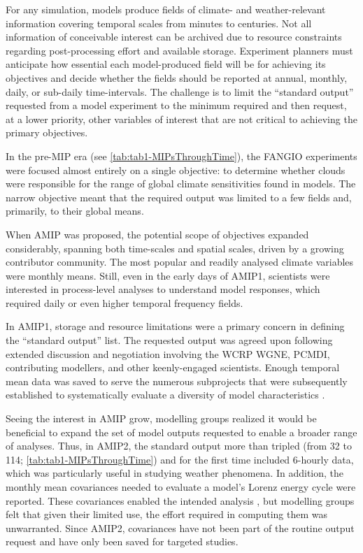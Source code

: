 \documentclass[manuscript]{copernicus}
\begin{document}
For any simulation, models produce fields of climate- and weather-relevant information covering temporal scales from minutes to centuries. Not all information of conceivable interest can be archived due to resource constraints regarding post-processing effort and available storage. Experiment planners must anticipate how essential each model-produced field will be for achieving its objectives and decide whether the fields should be reported at annual, monthly, daily, or sub-daily time-intervals. The challenge is to limit the ``standard output'' requested from a model experiment to the minimum required and then request, at a lower priority, other variables of interest that are not critical to achieving the primary objectives.

In the pre-MIP era (see \autoref{tab:tab1-MIPsThroughTime}), the FANGIO experiments were focused almost entirely on a single objective: to determine whether clouds were responsible for the range of global climate sensitivities found in models. The narrow objective meant that the required output was limited to a few fields and, primarily, to their global means.

When AMIP was proposed, the potential scope of objectives expanded considerably, spanning both time-scales and spatial scales, driven by a growing contributor community. The most popular and readily analysed climate variables were monthly means. Still, even in the early days of AMIP1, scientists were interested in process-level analyses to understand model responses, which required daily or even higher temporal frequency fields.

In AMIP1, storage and resource limitations were a primary concern in defining the ``standard output'' list. The requested output was agreed upon following extended discussion and negotiation involving the WCRP WGNE, PCMDI, contributing modellers, and other keenly-engaged scientists. Enough temporal mean data was saved to serve the numerous subprojects that were subsequently established to systematically evaluate a diversity of model characteristics \citep{gates_amip_1995}. 

Seeing the interest in AMIP grow, modelling groups realized it would be beneficial to expand the set of model outputs requested to enable a broader range of analyses. Thus, in AMIP2, the standard output more than tripled (from 32 to 114; \autoref{tab:tab1-MIPsThroughTime}) and for the first time included 6-hourly data, which was particularly useful in studying weather phenomena. In addition, the monthly mean covariances needed to evaluate a model's Lorenz energy cycle were reported. These covariances enabled the intended analysis \citep{boer_energy_2008}, but modelling groups felt that given their limited use, the effort required in computing them was unwarranted. Since AMIP2, covariances have not been part of the routine output request and have only been saved for targeted studies.
\end{document}
